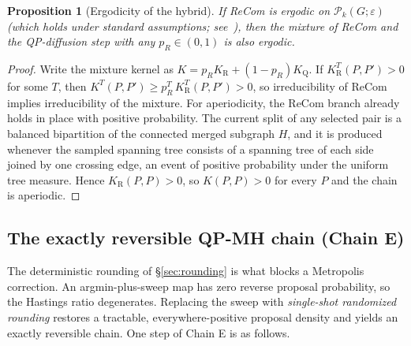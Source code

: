 \documentclass[11pt]{article}
\newtheorem{proposition}{Proposition}[section]
\begin{document}
\begin{proposition}[Ergodicity of the hybrid]\label{prop:ergodic}
If ReCom is ergodic on $\mathcal{P}_k(G; \varepsilon)$ (which holds
under standard assumptions; see~\cite{deford2021recombination,
cannon2024irreducibility}), then the mixture of ReCom and
the QP-diffusion step with any $p_R \in (0, 1)$ is also ergodic.
\end{proposition}

\begin{proof}
Write the mixture kernel as $K = p_R K_{\mathrm{R}} +
(1 - p_R) K_{\mathrm{Q}}$. If $K_{\mathrm{R}}^{T}(P, P') > 0$ for
some $T$, then $K^{T}(P, P') \ge p_R^{T}\, K_{\mathrm{R}}^{T}(P, P')
> 0$, so irreducibility of ReCom implies irreducibility of the
mixture. For aperiodicity, the ReCom branch already holds in place
with positive probability. The current split of any selected pair is
a balanced bipartition of the connected merged subgraph $H$, and it
is produced whenever the sampled spanning tree consists of a spanning
tree of each side joined by one crossing edge, an event of positive
probability under the uniform tree measure. Hence
$K_{\mathrm{R}}(P, P) > 0$, so $K(P, P) > 0$ for every $P$ and the
chain is aperiodic.
\end{proof}

\subsection{The exactly reversible QP-MH chain (Chain E)}\label{sec:qp-mh}

The deterministic rounding of \S\ref{sec:rounding} is what blocks a
Metropolis correction. An argmin-plus-sweep map has zero reverse
proposal probability, so the Hastings ratio degenerates. Replacing the
sweep with \emph{single-shot randomized rounding} restores a tractable,
everywhere-positive proposal density and yields an exactly reversible
chain. One step of Chain E is as follows.
\end{document}
